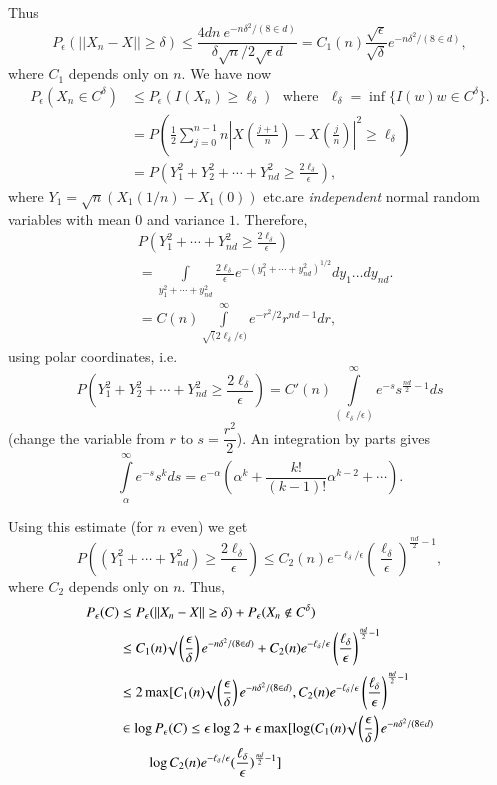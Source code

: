 Thus\pageoriginale
$$
P_{\epsilon}(||X_{n}-X||\geq \delta)\leq
\frac{4dn\ e^{-n\delta^{2}/(8\in d)}}{\delta\surd n/2\sqrt{\epsilon}
  d}=C_{1}(n)\frac{\surd \epsilon}{\surd\delta}e^{-n\delta^{2}/(8\in
  d)},
$$
where $C_{1}$ depends only on $n$. We have now
\begin{align*}
P_{\epsilon}(X_{n}\in C^{\delta}) &\leq P_{\epsilon}(I(X_{n})\geq
\ell_{\delta})\text{~ where~ }\ell_{\delta}=\inf \{I(w)w\in
C^{\delta}\}.\\
&=
P\left(\frac{1}{2}\sum\limits^{n-1}_{j=0}n|X\left(\frac{j+1}{n}\right)-X\left(\frac{j}{n}\right)|^{2}\geq
\ell_{\delta}\right)\\
&= P\left(Y^{2}_{1}+Y^{2}_{2}+\cdots+Y^{2}_{nd}\geq
\frac{2\ell_{\delta}}{\epsilon}\right), 
\end{align*}
where $Y_{1}=\surd n(X_{1}(1/n)-X_{1}(0))$ etc.\@ are {\em
  independent} normal random variables with mean $0$ and variance
$1$. Therefore,
\begin{align*}
& P(Y^{2}_{1}+\cdots+Y^{2}_{nd}\geq \frac{2\ell_{\delta}}{\epsilon})\\
&=\int\limits_{y^{2}_{1}+\cdots+y^{2}_{nd}}\frac{2\ell_{\delta}}{\epsilon}e^{-(y^{2}_{1}+\cdots+y^{2}_{nd})^{1/2}}dy_{1}\ldots
  dy_{nd}.\\
&=
  C(n)\int\limits^{\infty}_{\surd(2\ell_{\delta}/\epsilon)}e^{-r^{2}/2}r^{nd-1}dr, 
\end{align*}
using polar coordinates, i.e.
$$
P(Y^{2}_{1}+Y^{2}_{2}+\cdots+Y^{2}_{nd}\geq
\frac{2\ell_{\delta}}{\epsilon})=C'(n)\int\limits^{\infty}_{(\ell_{\delta}/\epsilon)}e^{-s}s^{\frac{nd}{2}-1}ds
$$
(change the variable from $r$ to $s=\dfrac{r^{2}}{2}$). An integration
by parts gives
$$
\int\limits^{\infty}_{\alpha}e^{-s}s^{k}ds=e^{-\alpha}(\alpha^{k}+\frac{k!}{(k-1)!}\alpha^{k-2}+\cdots). 
$$

Using this estimate (for $n$ even) we get
$$
P((Y^{2}_{1}+\cdots+Y^{2}_{nd})\geq
\frac{2\ell_{\delta}}{\epsilon})\leq
C_{2}(n)e^{-\ell_{\delta}/\epsilon}(\frac{\ell_{\delta}}{\epsilon})^{\frac{nd}{2}-1},
$$
where $C_{2}$ depends only on $n$. Thus,
\begin{align*}
P_{\epsilon}(C) &\leq P_{\epsilon}(||X_{n}-X||\geq
\delta)+P_{\epsilon}(X_{n}\not\in C^{\delta})\\
&\leq C_{1}(n)\surd\left(\frac{\epsilon}{\delta}\right)e^{-n\delta^{2}/(8\in
  d)}+C_{2}(n)e^{-\ell_{\delta}/\epsilon}\left(\frac{\ell_{\delta}}{\epsilon}
\right)^{\frac{nd}{2}-1}\\ 
&\leq 2\max [C_{1}(n)\surd
  \left(\frac{\epsilon}{\delta}\right)e^{-n\delta^{2}/(8\in
    d)},C_{2}(n)e^{-\ell_{\delta}/\epsilon}
\left(\frac{\ell_{\delta}}{\epsilon}\right)^{\frac{nd}{2}-1} \\
&\in \log P_{\epsilon}(C)\leq \epsilon \log 2+\epsilon
\max[\log(C_{1}(n)\surd\left(\frac{\epsilon}{\delta}\right)e^{-n\delta^{2}/(8\in
    d)}\\
&\qquad \log
  C_{2}(n)e^{-\ell_{\delta}/\epsilon}(\frac{\ell_{\delta}}{\epsilon})^{\frac{nd}{2}-1}] 
\end{align*}\pageoriginale


